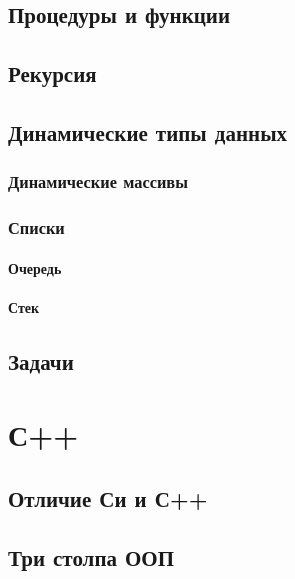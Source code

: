 \documentclass{bmstu}
\begin{document}
\section{Процедуры и функции}
\section{Рекурсия}
\section{Динамические типы данных}
\subsection{Динамические массивы}
\subsection{Списки}
\subsubsection{Очередь}
\subsubsection{Стек}
\section{Задачи}

\chapter{С++}
\section{Отличие Си и С++}
\section{Три столпа ООП}
\section{}
\end{document}
